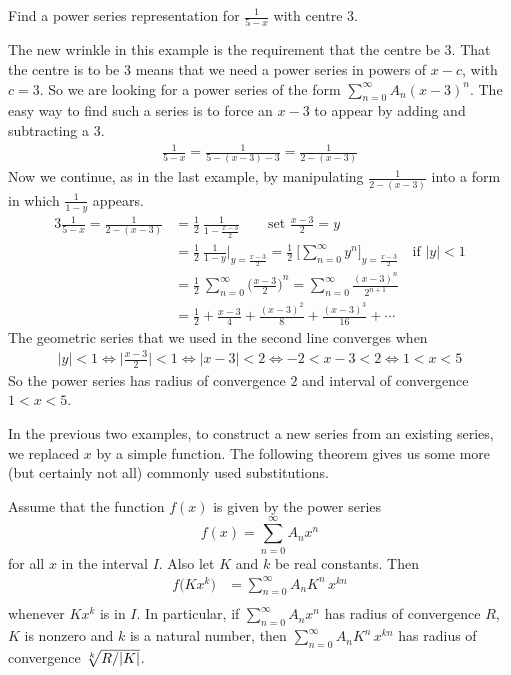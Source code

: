 \goodbreak
\begin{eg}\label{eg:SRpsrepAAA}
Find a power series representation for $\frac{1}{5-x}$ with centre
$3$.

\soln
The new wrinkle in this example is the requirement that the centre
be $3$. That the centre is to be $3$ means that we need a power series
in powers of $x-c$, with $c=3$.  So we are looking for a power
series of the form $\sum_{n=0}^\infty A_n(x-3)^n$. The easy way
to find such a series is to force an $x-3$ to appear by adding
and subtracting a $3$.
\begin{align*}
\frac{1}{5-x}
=\frac{1}{5-(x-3)-3}
=\frac{1}{2-(x-3)}
\end{align*}
Now we continue, as in the last example, by manipulating $\frac{1}{2-(x-3)}$
into a form in which $\frac{1}{1-y}$ appears.
\begin{alignat*}{3}
\frac{1}{5-x}
=\frac{1}{2-(x-3)} &= \frac{1}{2}\ \frac{1}{1-\frac{x-3}{2}}
             \qquad \text{set $\frac{x-3}{2}=y$} \\
             &= \frac{1}{2}\ \frac{1}{1-y}\bigg|_{y=\frac{x-3}{2}}
             = \frac{1}{2}\ \bigg[\sum_{n=0}^\infty y^n
                                     \bigg]_{y=\frac{x-3}{2}}
                   \quad\text{if $|y|<1$} \\
             &= \frac{1}{2}\ \sum_{n=0}^\infty {\Big(\frac{x-3}{2}\Big)}^n
             = \sum_{n=0}^\infty \frac{(x-3)^n}{2^{n+1}} \\
             &=\frac{1}{2} + \frac{x-3}{4} + \frac{(x-3)^2}{8} + \frac{(x-3)^3}{16}
                 +\cdots
\end{alignat*}
The geometric series that we used in the second line converges when
\begin{align*}
|y|<1
\iff  \Big|\frac{x-3}{2}\Big|<1
\iff  |x-3|<2
\iff -2<x-3<2
\iff 1<x<5
\end{align*}
So the power series has radius of convergence $2$ and interval of
convergence $1<x<5$.
\end{eg}


In the previous two examples, to construct a new series from an
existing series, we replaced $x$ by a simple function. The following
theorem gives us some more (but certainly not all) commonly
used substitutions.


\begin{theorem}\label{thm:SRpsSub}
Assume that the function $f(x)$ is given by the power
series
\begin{equation*}
f(x) = \sum_{n=0}^\infty A_n x^n
\end{equation*}
for all $x$ in the interval $I$. Also let $K$ and $k$ be real constants. Then
\begin{align*}
f\big(Kx^k\big)   &= \sum_{n=0}^\infty A_nK^n\, x^{kn} \\
\end{align*}
whenever $Kx^k$ is in $I$. In particular, if $\sum_{n=0}^\infty A_n x^n$
has radius of convergence $R$, $K$ is nonzero and $k$ is a natural number,
then $\sum_{n=0}^\infty A_nK^n\, x^{kn}$ has radius of convergence
$\root{k}\of{R/|K|}$.
\end{theorem}



